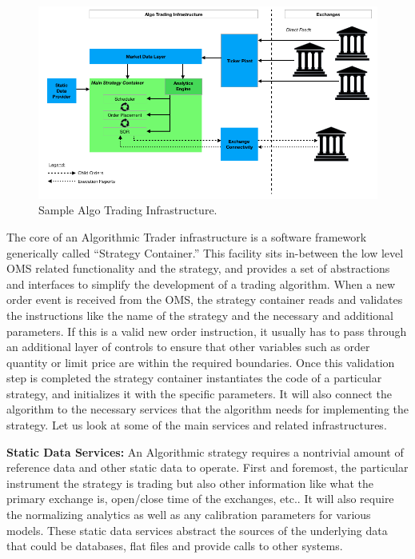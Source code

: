 	\begin{figure}[!ht]
	\centering
	\includegraphics[width=\textwidth]{chapters/chapter_tech/figures/AlgoInfraGraph.png} 
	\caption{Sample Algo Trading Infrastructure.\label{fig:AlgoInfraGraph}}
	\end{figure}
	
The core of an Algorithmic Trader infrastructure is a software framework generically called ``Strategy Container.'' This facility sits in-between the low level OMS related functionality and the strategy, and provides a set of abstractions and interfaces to simplify the development of a trading algorithm. When a new order event is received from the OMS, the strategy container reads and validates the instructions like the name of the strategy and the necessary and additional parameters. If this is a valid new order instruction, it usually has to pass through an additional layer of controls to ensure that other variables such as order quantity or limit price are within the required boundaries. Once this validation step is completed the strategy container instantiates the code of a particular strategy, and initializes it with the specific parameters. It will also connect the algorithm to the necessary services that the algorithm needs for implementing the strategy. Let us look at some of the main services and related infrastructures. \label{in:trad_infr4} \twomedskip


\noindent\textbf{Static Data Services:} An Algorithmic strategy requires a nontrivial amount of reference data and other static data to operate. First and foremost, the particular instrument the strategy is trading but also other information like what the primary exchange is, open/close time of the exchanges, etc.. It will also require the normalizing analytics as well as any calibration parameters for various models. These static data services abstract the sources of the underlying data that could be databases, flat files and provide calls to other systems. \twomedskip


